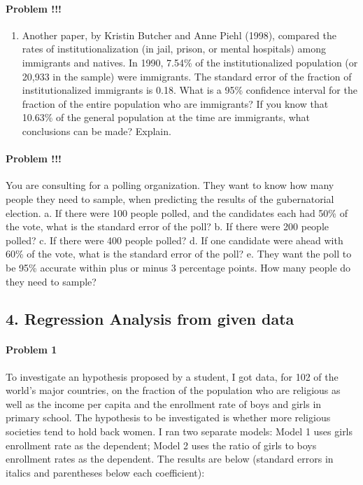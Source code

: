 \documentclass[]{article}
\providecommand{\tightlist}{%
  \setlength{\itemsep}{0pt}\setlength{\parskip}{0pt}}
\let\oldparagraph\paragraph
\renewcommand{\paragraph}[1]{\oldparagraph{#1}\mbox{}}
\begin{document}
\paragraph{Problem !!!}\label{problem-4}

\begin{enumerate}
\def\labelenumi{\arabic{enumi}.}
\setcounter{enumi}{50}
\tightlist
\item
  Another paper, by Kristin Butcher and Anne Piehl (1998), compared the
  rates of institutionalization (in jail, prison, or mental hospitals)
  among immigrants and natives. In 1990, 7.54\% of the institutionalized
  population (or 20,933 in the sample) were immigrants. The standard
  error of the fraction of institutionalized immigrants is 0.18. What is
  a 95\% confidence interval for the fraction of the entire population
  who are immigrants? If you know that 10.63\% of the general population
  at the time are immigrants, what conclusions can be made? Explain.
\end{enumerate}

\paragraph{Problem !!!}\label{problem-5}

You are consulting for a polling organization. They want to know how
many people they need to sample, when predicting the results of the
gubernatorial election. a. If there were 100 people polled, and the
candidates each had 50\% of the vote, what is the standard error of the
poll? b. If there were 200 people polled? c. If there were 400 people
polled? d. If one candidate were ahead with 60\% of the vote, what is
the standard error of the poll? e. They want the poll to be 95\%
accurate within plus or minus 3 percentage points. How many people do
they need to sample?

\subsection{4. Regression Analysis from given
data}\label{regression-analysis-from-given-data}

\paragraph{Problem 1}\label{problem-1-1}

To investigate an hypothesis proposed by a student, I got data, for 102
of the world's major countries, on the fraction of the population who
are religious as well as the income per capita and the enrollment rate
of boys and girls in primary school. The hypothesis to be investigated
is whether more religious societies tend to hold back women. I ran two
separate models: Model 1 uses girls enrollment rate as the dependent;
Model 2 uses the ratio of girls to boys enrollment rates as the
dependent. The results are below (standard errors in italics and
parentheses below each coefficient):
\end{document}

